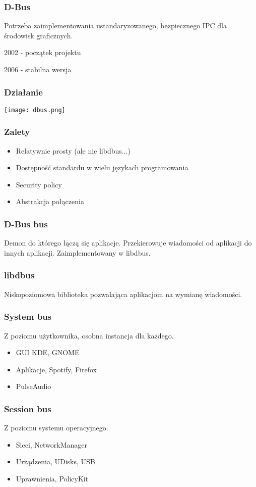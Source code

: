 \begin{frame}
    \frametitle{D-Bus}
    Potrzeba zaimplementowania ustandaryzowanego,
    bezpiecznego IPC dla
    środowisk graficznych.

    2002 - początek projektu

    2006 - stabilna wersja
\end{frame}

\begin{frame}
    \frametitle{Działanie}
    \texttt{[image: dbus.png]}
\end{frame}

\begin{frame}
    \frametitle{Zalety}
    \begin{itemize}
        \item Relatywnie prosty (ale nie libdbus...)
        \item Dostępność standardu w wielu językach programowania
        \item Security policy
        \item Abstrakcja połączenia
    \end{itemize}
\end{frame}

\begin{frame}
    \frametitle{D-Bus bus}
    Demon do którego łączą się aplikacje. Przekierowuje
    wiadomości od aplikacji do innych aplikacji. Zaimplementowany
    w libdbus.
\end{frame}

\begin{frame}
    \frametitle{libdbus}
    Niskopoziomowa biblioteka pozwalająca aplikacjom na wymianę 
    wiadomości.
\end{frame}

\begin{frame}
    \frametitle{System bus}
    Z poziomu użytkownika, osobna instancja dla każdego.
    \begin{itemize}
        \item GUI KDE, GNOME
        \item Aplikacje, Spotify, Firefox
        \item PulseAudio
    \end{itemize}
\end{frame}

\begin{frame}
    \frametitle{Session bus}
    Z poziomu systemu operacyjnego.
    \begin{itemize}
        \item Sieci, NetworkManager
        \item Urządzenia, UDisks, USB
        \item Uprawnienia, PolicyKit
    \end{itemize}
\end{frame}

